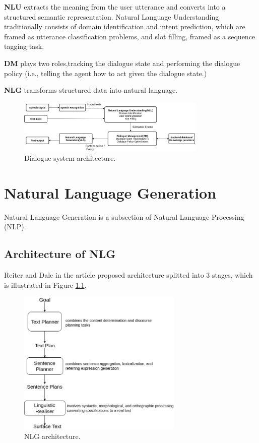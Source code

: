 \textbf{NLU} extracts the meaning from the user utterance and converts into a structured semantic representation. Natural Language Understanding traditionally consists of domain identification and intent prediction, which are framed as utterance classification problems, and slot filling, framed as a sequence tagging task.

\textbf{DM} plays two roles,tracking the dialogue state and performing the dialogue policy (i.e., telling the agent how to act given the dialogue state.)

\textbf{NLG} transforms structured data into natural language.\cite{open_domain_neural_ds}
\begin{figure}[hbt]
  \centering
  \includegraphics[width=0.8\textwidth]{figures/ds_arcitecture.jpg}
  \caption{Dialogue system architecture.}
  \label{ds architecture}
\end{figure}

\chapter{Natural Language Generation}\label{nlg}
Natural Language Generation is a subsection of Natural Language Processing (NLP).

\section{Architecture of NLG}
  Reiter and Dale in the article \cite{applied_nlg} proposed architecture splitted into 3 stages, which is illustrated in Figure \ref{nlg architecture}. 
\begin{figure}[hbt]
  \centering
  \includegraphics[width=0.7\textwidth]{figures/nlg_architecture.jpg}
  \caption{NLG architecture.}
  \label{nlg architecture}
\end{figure}

